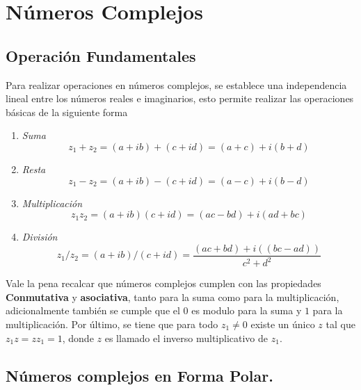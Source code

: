 \section{Números Complejos}

    \subsection{Operación Fundamentales}


        Para realizar operaciones en números complejos, se establece una independencia lineal entre los números reales e imaginarios, esto permite realizar las operaciones básicas de la siguiente forma

        \begin{enumerate}
            \item \textit{Suma}
                \begin{equation*}
                    z_1 + z_2 = (a + ib) + (c + id) = (a + c) + i (b + d)
                \end{equation*}
            \item \textit{Resta}
                \begin{equation*}
                    z_1 - z_2 = (a + ib) - (c + id) = (a - c) + i (b - d)
                \end{equation*}
            \item \textit{Multiplicación}
                \begin{equation*}
                    z_1z_2 = (a + ib)(c + id) = (ac - bd) + i(ad + bc)
                \end{equation*}
            \item \textit{División}
                \begin{equation*}
                    z_1/z_2 = (a + ib)/(c + id) = \frac{(ac + bd) + i((bc-ad))}{c^2+d^2}  
                \end{equation*}        
        \end{enumerate}

        Vale la pena recalcar que números complejos cumplen con las propiedades  \textbf{Conmutativa} y \textbf{asociativa}, tanto para la suma como para la multiplicación, adicionalmente también se cumple que el $0$ es modulo para la suma y $1$ para la multiplicación. Por último, se tiene que para todo $z_1 \neq 0$ existe un único $z$ tal que $z_1z = zz_1 = 1$, donde $z$ es llamado el inverso multiplicativo de $z_1$.
    
    \subsection{Números complejos en Forma Polar.}

